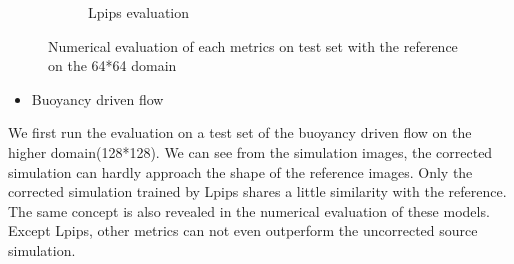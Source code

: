 \documentclass[a4paper,12pt,twoside]{report}
\begin{document}
\begin{figure}
\begin{subfigure}{0.32\textwidth}
		\caption{Lpips evaluation}
	\end{subfigure}
	\caption{Numerical evaluation of each metrics on test set with the reference on the 64*64 domain}
\end{figure}

\begin{itemize}
  \item Buoyancy driven flow
\end{itemize}
We first run the evaluation on a test set of the buoyancy driven flow on the higher domain(128*128). We can see from the simulation images, the corrected simulation can hardly approach the shape of the reference images. Only the corrected simulation trained by Lpips shares a little similarity with the reference. The same concept is also revealed in the numerical evaluation of these models. Except Lpips, other metrics can not even outperform the uncorrected source simulation. 
\end{document}

